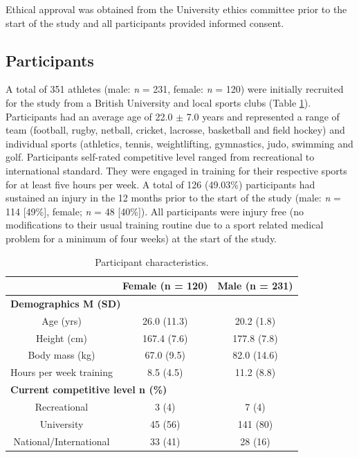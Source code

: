 \documentclass[
  english,
  man]{apa6}
\begin{document}
Ethical approval was obtained from the University ethics committee prior to the start of the study and all participants provided informed consent.

\hypertarget{participants}{%
\subsection{Participants}\label{participants}}

A total of 351 athletes (male: \emph{n} = 231, female: \emph{n} = 120) were initially recruited for the study from a British University and local sports clubs (Table \ref{tab:table1}). Participants had an average age of 22.0 \(\pm\) 7.0 years and represented a range of team (football, rugby, netball, cricket, lacrosse, basketball and field hockey) and individual sports (athletics, tennis, weightlifting, gymnastics, judo, swimming and golf.
Participants self-rated competitive level ranged from recreational to international standard.
They were engaged in training for their respective sports for at least five hours per week.
A total of 126 (49.03\%) participants had sustained an injury in the 12 months prior to the start of the study (male: \emph{n} = 114 {[}49\%{]}, female; \emph{n} = 48 {[}40\%{]}).
All participants were injury free (no modifications to their usual training routine due to a sport related medical problem for a minimum of four weeks) at the start of the study.

\begin{table}[H]

\caption{\label{tab:table1}Participant characteristics.}
\centering
\begin{tabular}[t]{c|c|c}
\hline
\textbf{ } & \textbf{Female (n = 120)} & \textbf{Male (n = 231)}\\
\hline
\multicolumn{3}{l}{\textbf{Demographics M (SD)}}\\
\hline
\hspace{1em}Age (yrs) & 26.0 (11.3) & 20.2 (1.8)\\
\hline
\hspace{1em}Height (cm) & 167.4 (7.6) & 177.8 (7.8)\\
\hline
\hspace{1em}Body mass (kg) & 67.0 (9.5) & 82.0 (14.6)\\
\hline
\hspace{1em}Hours per week training & 8.5 (4.5) & 11.2 (8.8)\\
\hline
\multicolumn{3}{l}{\textbf{Current competitive level n (\%)}}\\
\hline
\hspace{1em}Recreational & 3 (4) & 7 (4)\\
\hline
\hspace{1em}University & 45 (56) & 141 (80)\\
\hline
\hspace{1em}National/International & 33 (41) & 28 (16)\\
\hline
\end{tabular}
\end{table}
\end{document}

